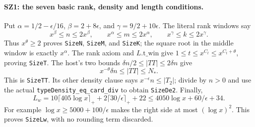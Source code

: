 \paragraph{SZ1: the seven basic rank, density and length conditions.}
Put $\alpha=1/2-\epsilon/16$, $\beta=2+8\epsilon$, and
$\gamma=9/2+10\epsilon$. The literal rank windows say
\[
 x^\beta\leq n\leq2x^\beta,\qquad
 x^\alpha\leq m\leq2x^\alpha,\qquad
 x^\gamma\leq k\leq2x^\gamma.                                  \tag{SZ.3}
\]
Thus $x^\theta\geq2$ proves \texttt{SizeN}, \texttt{SizeM}, and
\texttt{SizeK}; the square root in the middle window is exactly
$x^\alpha$. The rank axiom and $L.\mathrm{t\_win}$ give
$1\leq t\leq x^{C_t}\leq x^{C_t+\theta}$, proving
\texttt{SizeT}. The host's two bounds
$\delta n/2\leq|TT|\leq2\delta n$ give
\[
       x^{-\theta}\delta n\leq |TT|\leq N_*.
\]
This is \texttt{SizeTT}. Its other density clause says
$x^{-\epsilon}n\leq |T_2|$; divide by $n>0$ and use the actual
\texttt{typeDensity\_eq\_card\_div} to obtain
\texttt{SizeDe2}. Finally,
\[
 L_w=10\lceil405\log x\rceil_+
             +2\lceil30/\epsilon\rceil_++22
       \leq4050\log x+60/\epsilon+34.
\]
For example $\log x\geq5000+100/\epsilon$ makes the right side
at most $(\log x)^2$. This proves \texttt{SizeLw}, with no rounding
term discarded.

